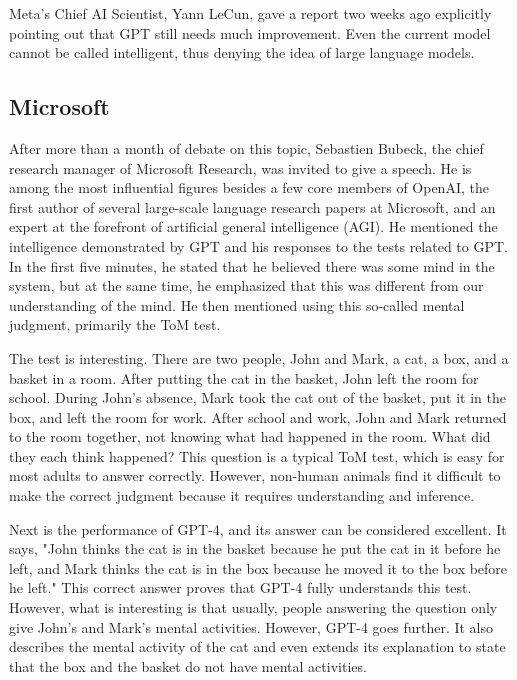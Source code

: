 \documentclass[10pt,journal,compsoc]{IEEEtran}
\begin{document}
Meta's Chief AI Scientist, Yann LeCun, gave a report two weeks ago explicitly pointing out that GPT still needs much improvement. Even the current model cannot be called intelligent, thus denying the idea of large language models.\cite{FB}


\subsection{Microsoft}

After more than a month of debate on this topic, Sebastien Bubeck, the chief research manager of Microsoft Research, was invited to give a speech. He is among the most influential figures besides a few core members of OpenAI, the first author of several large-scale language research papers at Microsoft, and an expert at the forefront of artificial general intelligence (AGI). He mentioned the intelligence demonstrated by GPT and his responses to the tests related to GPT. In the first five minutes, he stated that he believed there was some mind in the system, but at the same time, he emphasized that this was different from our understanding of the mind. He then mentioned using this so-called mental judgment, primarily the ToM test. \cite{微软}

The test is interesting. There are two people, John and Mark, a cat, a box, and a basket in a room. After putting the cat in the basket, John left the room for school. During John's absence, Mark took the cat out of the basket, put it in the box, and left the room for work. After school and work, John and Mark returned to the room together, not knowing what had happened in the room. What did they each think happened? \cite{微软} This question is a typical ToM test, which is easy for most adults to answer correctly. However, non-human animals find it difficult to make the correct judgment because it requires understanding and inference.

Next is the performance of GPT-4, and its answer can be considered excellent. It says, "John thinks the cat is in the basket because he put the cat in it before he left, and Mark thinks the cat is in the box because he moved it to the box before he left." This correct answer proves that GPT-4 fully understands this test. However, what is interesting is that usually, people answering the question only give John's and Mark's mental activities. However, GPT-4 goes further. It also describes the mental activity of the cat and even extends its explanation to state that the box and the basket do not have mental activities. \cite{微软}
\end{document}
